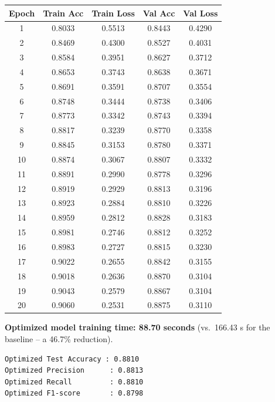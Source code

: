 \documentclass[11pt]{article}
\begin{document}
\begin{center}
{\small
\begin{tabular}{|c|c|c|c|c|}
\hline
\textbf{Epoch} & \textbf{Train Acc} & \textbf{Train Loss} & \textbf{Val Acc} & \textbf{Val Loss} \\ \hline
1  & 0.8033 & 0.5513 & 0.8443 & 0.4290 \\ \hline
2  & 0.8469 & 0.4300 & 0.8527 & 0.4031 \\ \hline
3  & 0.8584 & 0.3951 & 0.8627 & 0.3712 \\ \hline
4  & 0.8653 & 0.3743 & 0.8638 & 0.3671 \\ \hline
5  & 0.8691 & 0.3591 & 0.8707 & 0.3554 \\ \hline
6  & 0.8748 & 0.3444 & 0.8738 & 0.3406 \\ \hline
7  & 0.8773 & 0.3342 & 0.8743 & 0.3394 \\ \hline
8  & 0.8817 & 0.3239 & 0.8770 & 0.3358 \\ \hline
9  & 0.8845 & 0.3153 & 0.8780 & 0.3371 \\ \hline
10 & 0.8874 & 0.3067 & 0.8807 & 0.3332 \\ \hline
11 & 0.8891 & 0.2990 & 0.8778 & 0.3296 \\ \hline
12 & 0.8919 & 0.2929 & 0.8813 & 0.3196 \\ \hline
13 & 0.8923 & 0.2884 & 0.8810 & 0.3226 \\ \hline
14 & 0.8959 & 0.2812 & 0.8828 & 0.3183 \\ \hline
15 & 0.8981 & 0.2746 & 0.8812 & 0.3252 \\ \hline
16 & 0.8983 & 0.2727 & 0.8815 & 0.3230 \\ \hline
17 & 0.9022 & 0.2655 & 0.8842 & 0.3155 \\ \hline
18 & 0.9018 & 0.2636 & 0.8870 & 0.3104 \\ \hline
19 & 0.9043 & 0.2579 & 0.8867 & 0.3104 \\ \hline
20 & 0.9060 & 0.2531 & 0.8875 & 0.3110 \\ \hline
\end{tabular}
}
\end{center}

\textbf{Optimized model training time: 88.70 seconds} (vs.\ 166.43 s for the baseline -- a 46.7\%
reduction).

{\scriptsize
\begin{verbatim}
Optimized Test Accuracy : 0.8810
Optimized Precision      : 0.8813
Optimized Recall         : 0.8810
Optimized F1-score       : 0.8798
\end{verbatim}
}
\end{document}
